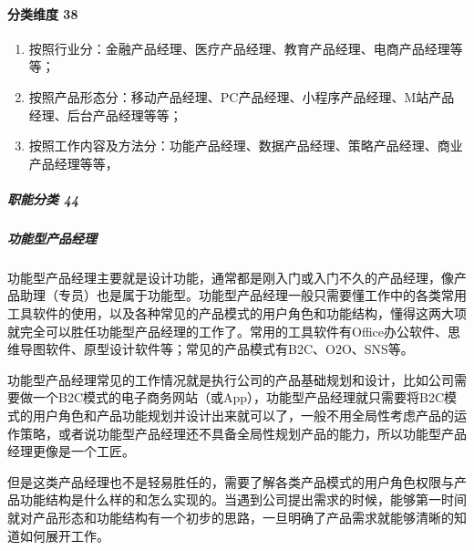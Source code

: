 \documentclass[letterpaper,10pt,english]{sphinxmanual}
\begin{document}
\paragraph{分类维度 38\sphinxfootnotemark[182]}
\label{\detokenize{chapter_introduction/PM:id17}}%
\begin{footnotetext}[182]\sphinxAtStartFootnote
{}
%
\end{footnotetext}\ignorespaces \begin{enumerate}
%
\item {} 
按照行业分：金融产品经理、医疗产品经理、教育产品经理、电商产品经理等等；

\item {} 
按照产品形态分：移动产品经理、PC产品经理、小程序产品经理、M站产品经理、后台产品经理等等；

\item {} 
按照工作内容及方法分：功能产品经理、数据产品经理、策略产品经理、商业产品经理等等，

\end{enumerate}


\subparagraph{职能分类 44\sphinxfootnotemark[183]}
\label{\detokenize{chapter_introduction/PM:id18}}%
\begin{footnotetext}[183]\sphinxAtStartFootnote
{}
%
\end{footnotetext}\ignorespaces 

\subparagraph{功能型产品经理}
\label{\detokenize{chapter_introduction/PM:id19}}
功能型产品经理主要就是设计功能，通常都是刚入门或入门不久的产品经理，像产品助理（专员）也是属于功能型。功能型产品经理一般只需要懂工作中的各类常用工具软件的使用，以及各种常见的产品模式的用户角色和功能结构，懂得这两大项就完全可以胜任功能型产品经理的工作了。常用的工具软件有Office办公软件、思维导图软件、原型设计软件等；常见的产品模式有B2C、O2O、SNS等。

功能型产品经理常见的工作情况就是执行公司的产品基础规划和设计，比如公司需要做一个B2C模式的电子商务网站（或App），功能型产品经理就只需要将B2C模式的用户角色和产品功能规划并设计出来就可以了，一般不用全局性考虑产品的运作策略，或者说功能型产品经理还不具备全局性规划产品的能力，所以功能型产品经理更像是一个工匠。

但是这类产品经理也不是轻易胜任的，需要了解各类产品模式的用户角色权限与产品功能结构是什么样的和怎么实现的。当遇到公司提出需求的时候，能够第一时间就对产品形态和功能结构有一个初步的思路，一旦明确了产品需求就能够清晰的知道如何展开工作。
\end{document}
